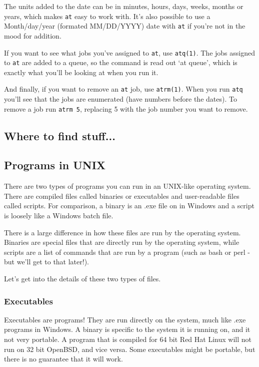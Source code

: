 The units added to the date can be in minutes,
hours, days, weeks, months or years, which makes {\tt at} easy to work with. It's also 
possible to use a Month/day/year (formated MM/DD/YYYY) date with {\tt at} if you're not in 
the mood for addition.

If you want to see what jobs you've assigned to {\tt at}, use {\tt atq(1)}.
The jobs assigned to {\tt at} are added to a queue, so the command is 
read out `at queue', which is exactly what you'll be looking at when you 
run it.

And finally, if you want to remove an {\tt at} job, use {\tt atrm(1)}.
When you run {\tt atq} you'll see that the jobs are enumerated (have numbers before 
the dates). To remove a job run {\tt atrm 5}, replacing 5 with the job number you want to remove.
			
\subsection {Where to find stuff...} 
		

\subsection {Programs in UNIX}


	There are two types of programs you can run in an UNIX-like operating system.
	There are compiled files called binaries or executables and user-readable 
	files called scripts. For comparison, a binary is an .exe file on in Windows and a script 
	is loosely like a Windows batch file.

	There is a large difference in how these files are run by the operating system.
	Binaries are special files that are directly run by the operating system, while
	scripts are a list of commands that are run by a program (such as bash or 
	perl - but we'll get to that later!).

	Let's get into the details of these two types of files.


\subsubsection {Executables} 

	
	Executables are programs! They are run directly on the system, much like .exe programs
	in Windows. A binary is specific to the system it is running on, and it not very portable.
	A program that is compiled for 64 bit Red Hat Linux will not run on 32 bit OpenBSD, and vice versa.
	Some executables might be portable, but there is no guarantee that it will work. 
	
